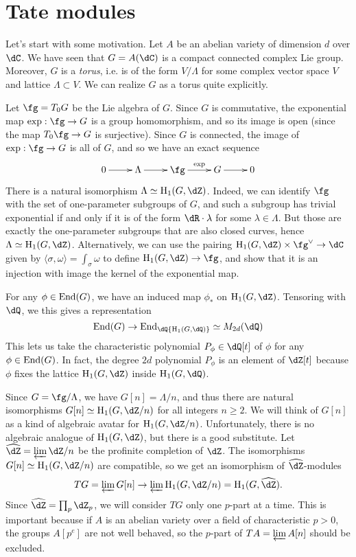 \documentclass{article}
\begin{document}
\section{Tate modules}

Let's start with some motivation. Let $A$ be an abelian variety of dimension 
$d$ over $\dC$. We have seen that $G=A(\dC)$ is a compact connected complex Lie 
group. Moreover, $G$ is a \emph{torus}, i.e. is of the form $V/\Lambda$ for 
some complex vector space $V$ and lattice $\Lambda\subset V$. We can realize 
$G$ as a torus quite explicitly. 

Let $\fg=T_0 G$ be the Lie algebra of $G$. Since $G$ is commutative, the 
exponential map $\exp:\fg\to G$ is a group homomorphism, and so its image is 
open (since the map $T_0 \fg\to G$ is surjective). Since $G$ is connected, 
the image of $\exp:\fg\to G$ is all of $G$, and so we have an exact sequence 
\[\xymatrix{
  0 \ar[r] 
    & \Lambda \ar[r] 
    & \fg \ar[r]^-{\exp} 
    & G \ar[r] 
    & 0
}\]
There is a natural isomorphism $\Lambda\simeq \h_1(G,\dZ)$. Indeed, we can 
identify $\fg$ with the set of one-parameter subgroups of $G$, and such a 
subgroup has trivial exponential if and only if it is of the form 
$\dR\cdot \lambda$ for some $\lambda\in\Lambda$. But those are exactly the 
one-parameter subgroups that are also closed curves, hence 
$\Lambda\simeq \h_1(G,\dZ)$. Alternatively, we can use the pairing 
$\h_1(G,\dZ)\times \fg^\vee\to \dC$ given by 
$\langle \sigma,\omega\rangle=\int_\sigma\omega$ to define 
$\h_1(G,\dZ)\to \fg$, and show that it is an injection with image the kernel 
of the exponential map. 

For any $\phi\in \operatorname{End}(G)$, we have an induced map $\phi_\ast$ on 
$\h_1(G,\dZ)$. Tensoring with $\dQ$, we this gives a representation 
\[
  \End(G) \to \End_\dQ{\h_1(G,\dQ)} \simeq M_{2 d}(\dQ)
\]
This lets us take the characteristic polynomial $P_\phi\in \dQ[t]$ of $\phi$ 
for any $\phi\in \operatorname{End}(G)$. In fact, the degree $2 d$ polynomial 
$P_\phi$ is an element of $\dZ[t]$ because $\phi$ fixes the lattice 
$\h_1(G,\dZ)$ inside $\h_1(G,\dQ)$. 

Since $G=\fg/\Lambda$, we have $G[n]=\Lambda/n$, and thus there are natural 
isomorphisms $G[n]\simeq \h_1(G,\dZ/n)$ for all integers $n\geqslant 2$. 
We will think of $G[n]$ as a kind of algebraic avatar for $\h_1(G,\dZ/n)$. 
Unfortunately, there is no algebraic analogue of $\h_1(G,\dZ)$, but there is a 
good substitute. Let $\widehat\dZ=\varprojlim \dZ/n$ be the profinite 
completion of $\dZ$. The isomorphisms $G[n]\simeq \h_1(G,\dZ/n)$ are 
compatible, so we get an isomorphism of $\widehat\dZ$-modules 
\[
  T G = \varprojlim G[n] \to \varprojlim \h_1(G,\dZ/n) = \h_1(G,\widehat\dZ) \text{.}
\]
Since $\widehat\dZ=\prod_p \dZ_p$, we will consider $T G$ only one $p$-part at 
a time. This is important because if $A$ is an abelian variety over a field of 
characteristic $p>0$, the groups $A[p^e]$ are not well behaved, so the 
$p$-part of $T A=\varprojlim A[n]$ should be excluded. 
\end{document}
